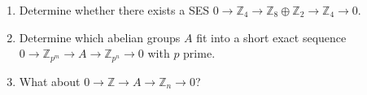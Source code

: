 \documentclass[twoside,10pt]{article}
\begin{document}

\begin{exer}[2.1: 14]
	\begin{enumerate}
		\item Determine whether there exists a SES $0\to \mathbb{Z}_4 \to \mathbb{Z}_{8}\oplus \mathbb{Z}_{2}\to \mathbb{Z}_{4}\to 0$.
		\item Determine which abelian groups $A$ fit into a short exact sequence $0\to \mathbb{Z}_{p^{m}}\to A\to \mathbb{Z}_{p^{n}}\to 0$ with $p$ prime.
		\item What about $0\to \mathbb{Z}\to A\to \mathbb{Z}_{n}\to 0$?
	\end{enumerate}
\end{exer}
\end{document}
